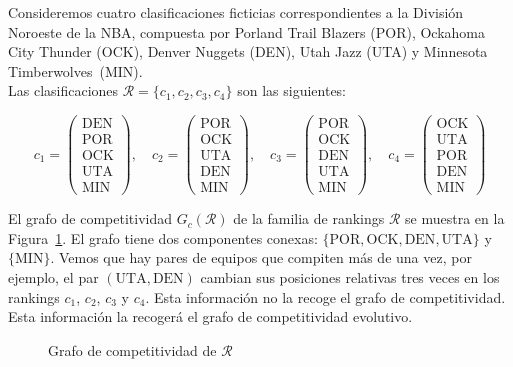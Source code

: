 \begin{ejemplo} \label{ej:grafo_competitividad}
Consideremos cuatro clasificaciones ficticias correspondientes a la División Noroeste de la NBA, compuesta por Porland Trail Blazers (POR), Ockahoma City Thunder (OCK), Denver Nuggets (DEN), Utah Jazz (UTA) y Minnesota Timberwolves~(MIN).\\

Las clasificaciones $\mathcal{R} = \{c_1, c_2, c_3, c_4\}$ son las siguientes:

\begin{equation*}
c_1 = \left( \begin{array}{c}
\text{DEN}\\
\text{POR}\\
\text{OCK}\\
\text{UTA}\\
\text{MIN}
\end{array} \right), \quad
c_2 = \left( \begin{array}{c}
\text{POR}\\
\text{OCK}\\
\text{UTA}\\
\text{DEN}\\
\text{MIN}
\end{array} \right), \quad
c_3 = \left( \begin{array}{c}
\text{POR}\\
\text{OCK}\\
\text{DEN}\\
\text{UTA}\\
\text{MIN}
\end{array} \right), \quad
c_4 = \left( \begin{array}{c}
\text{OCK}\\
\text{UTA}\\
\text{POR}\\
\text{DEN}\\
\text{MIN}
\end{array} \right)
\end{equation*}

El grafo de competitividad $G_c(\mathcal{R})$ de la familia de rankings $\mathcal{R}$ se muestra en la Figura~\ref{fig:grafo_competitividad}. El grafo tiene dos componentes conexas: $\{\text{POR}, \text{OCK}, \text{DEN}, \text{UTA}\}$ y $\{\text{MIN}\}$. Vemos que hay pares de equipos que compiten más de una vez, por ejemplo, el par $(\text{UTA}, \text{DEN})$ cambian sus posiciones relativas tres veces en los rankings $c_1$, $c_2$, $c_3$ y $c_4$. Esta información no la recoge el grafo de competitividad. Esta información la recogerá el grafo de competitividad evolutivo.

\begin{figure}[htb]
\centering
\ejemplografocompetitividad
\caption[Grafo de competitividad]{Grafo de competitividad de $\mathcal{R}$}
\label{fig:grafo_competitividad}
\end{figure} 

\end{ejemplo}

